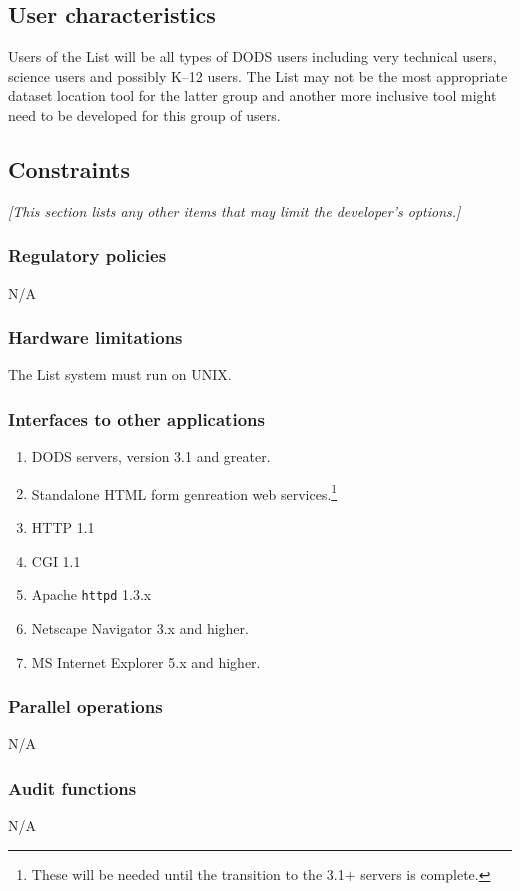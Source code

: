 \documentclass{article}
\begin{document}
\subsection{User characteristics}
Users of the List will be all types of \acs{DODS} users including very
technical users, science users and possibly K--12 users. The List may not be
the most appropriate dataset location tool for the latter group and another
more inclusive tool might need to be developed for this group of users.

\subsection{Constraints}
\emph{[This section lists any other items that may limit the developer's
  options.]}

\subsubsection{Regulatory policies}
N/A

\subsubsection{Hardware limitations}
The List system must run on UNIX.

\subsubsection{Interfaces to other applications}
\begin{enumerate}
\item DODS servers, version 3.1 and greater.
\item Standalone HTML form genreation web services.\footnote{These will be
    needed until the transition to the 3.1$+$ servers is complete.}
\item HTTP 1.1
\item \acs{CGI} 1.1
\item Apache {\tt httpd} 1.3.x
\item Netscape Navigator 3.x and higher.
\item MS Internet Explorer 5.x and higher.
\end{enumerate}

\subsubsection{Parallel operations}
N/A 

\subsubsection{Audit functions}
N/A 
\end{document}
